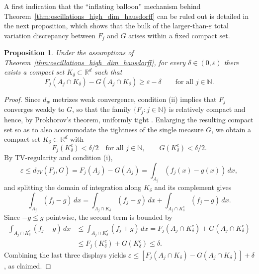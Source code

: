 \documentclass[12pt]{article}
\newtheorem{proposition}{Proposition}
\newcommand{\RR}{\mathbb{R}}
\newcommand{\NN}{\mathbb{N}}
\begin{document}
A first indication that the ``inflating balloon'' mechanism behind Theorem~\ref{thm:oscillations_high_dim_hausdorff} can be ruled out is detailed in the next proposition, which shows that the bulk of the larger-than-$\varepsilon$ total variation discrepancy between $F_j$ and $G$ arises within a fixed compact set.

\begin{proposition}\label{prop:compact_mass}
Under the assumptions of Theorem~\ref{thm:oscillations_high_dim_hausdorff}, for every
$\delta \in (0,\varepsilon)$ there exists a compact set $K_\delta \subset \RR^d$ such that
\begin{equation*}
F_j(A_j \cap K_\delta) - G(A_j \cap K_\delta) \geq \varepsilon - \delta
\qquad \text{for all } j \in \NN.
\end{equation*}
\end{proposition}

\begin{proof}
Since $d_w$ metrizes weak convergence, condition (ii) implies that $F_j$ converges weakly to $G$,
so that the family $\{F_j : j \in \NN\}$ is relatively compact and hence, by
Prokhorov's theorem, uniformly tight
\citep{billingsley1999}. Enlarging the resulting compact set so as to also
accommodate the tightness of the single measure $G$, we obtain a compact set
$K_\delta \subset \RR^d$ with
\begin{equation*}
F_j(K_\delta^c) < \delta/2\quad \text{for all } j \in \NN,
\qquad G(K_\delta^c) < \delta/2.
\end{equation*}
By TV-regularity and condition (i),
\begin{equation*}
\varepsilon \leq d_{TV}(F_j, G) = F_j(A_j) - G(A_j) = \int_{A_j} (f_j(x) - g(x))\,dx,
\end{equation*}
and splitting the domain of integration along $K_\delta$ and its complement gives
\begin{equation*}
\int_{A_j} (f_j - g)\,dx
= \int_{A_j \cap K_\delta} (f_j - g)\,dx + \int_{A_j \cap K_\delta^c} (f_j - g)\,dx.
\end{equation*}
Since $-g \leq g$ pointwise, the second term is bounded by
\begin{align*}
\int_{A_j \cap K_\delta^c} (f_j - g)\,dx
&\leq \int_{A_j \cap K_\delta^c} (f_j + g)\,dx
= F_j(A_j \cap K_\delta^c) + G(A_j \cap K_\delta^c) \\
&\leq F_j(K_\delta^c) + G(K_\delta^c) \leq \delta.
\end{align*}
Combining the last three displays yields
$\varepsilon \leq [F_j(A_j \cap K_\delta) - G(A_j \cap K_\delta)] + \delta$, as claimed.
\end{proof}
\end{document}
